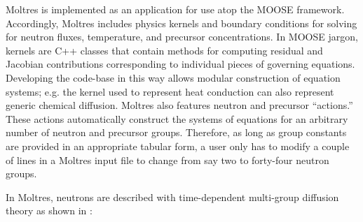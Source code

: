 \documentclass{article}
\begin{document}
Moltres \cite{lindsay_moltres_2017} is implemented as an application for
use atop the \gls{MOOSE} \cite{gaston_physics-based_2015} framework.
Accordingly, Moltres includes physics kernels and boundary conditions for
solving for neutron fluxes, temperature, and precursor concentrations. In \gls{MOOSE}
jargon, kernels are C++ classes that contain methods for computing residual and
Jacobian contributions corresponding to individual pieces of governing
equations. Developing the code-base in this way allows modular construction
of equation systems; e.g. the kernel used to represent heat
conduction can also represent generic chemical diffusion. Moltres
also features neutron and precursor ``actions.'' These actions automatically 
construct the systems of equations for an arbitrary number of neutron and
precursor groups. Therefore, as long as group constants are provided in an appropriate
tabular form, a user only has to modify a couple of lines in a Moltres input
file to change from say two to forty-four neutron groups.

In Moltres, neutrons are described with time-dependent multi-group diffusion theory as shown
in :
\end{document}
